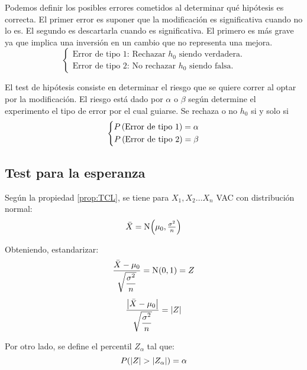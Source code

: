 \documentclass[a5paper,12pt,twoside]{book}
\begin{document}
Podemos definir los posibles errores cometidos al determinar qué hipótesis es correcta.
El primer error es suponer que la modificación es significativa cuando no lo es.
El segundo es descartarla cuando es significativa.
El primero es más grave ya que implica una inversión en un cambio que no representa una mejora.
\begin{equation*}
    \left\{
    \begin{aligned}
        \text{Error de tipo 1: Rechazar $h_0$ siendo verdadera.}
        \\
        \text{Error de tipo 2: No rechazar $h_0$ siendo falsa.}
    \end{aligned}
    \right.
\end{equation*}

El test de hipótesis consiste en determinar el riesgo que se quiere correr al optar por la modificación.
El riesgo está dado por $\alpha$ o $\beta$ según determine el experimento el tipo de error por el cual guiarse.
Se rechaza o no $h_0$ si y solo si
\begin{equation*}
    \left\{
    \begin{aligned}
        P \bb{\text{Error de tipo 1}} = \alpha
        \\
        P \bb{\text{Error de tipo 2}} = \beta
    \end{aligned}
    \right.
\end{equation*}


\subsection{Test para la esperanza}

Según la propiedad \ref{prop:TCL}, se tiene para $X_1, X_2 \dots X_n$ VAC con distribución normal:
\begin{equation*}
    \ave{X} = \fx[\nor]{\mu_0, \tfrac{\sigma^2}{n}}
\end{equation*}

Obteniendo, estandarizar:
\begin{gather*}
    \frac{\ave{X}-\mu_0}{\sqrt{\dfrac{\sigma^2}{n}}} = \fx[\nor]{0,1} = Z
    \\[1ex]
    \frac{\norm{\ave{X}-\mu_0}}{\sqrt{\dfrac{\sigma^2}{n}}} = \norm{Z}
\end{gather*}

Por otro lado, se define el percentil $Z_\alpha$ tal que:
\begin{equation*}
    P(\norm{Z}>\norm{Z_\alpha}) = \alpha
\end{equation*}
\end{document}

